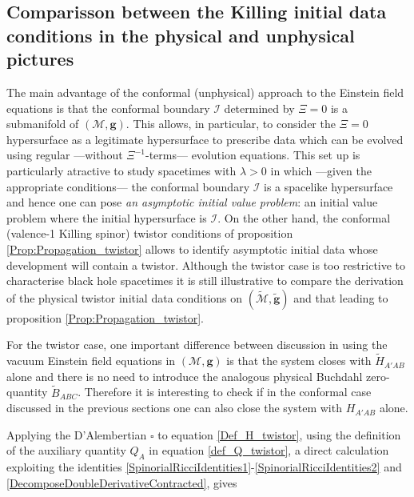 \documentclass[10pt,a4paper]{article}
\theoremstyle{plain}
\def\bmg{{\bm g}}
\begin{document}
{\subsection{Comparisson between the Killing initial data conditions
  in the physical and unphysical pictures}

The main advantage of the conformal (unphysical) approach to the
Einstein field equations is that the conformal boundary $\mathscr{I}$
determined by $\Xi=0$ is a submanifold of $(\mathcal{M},\bmg)$. This
allows, in particular, to consider the $\Xi=0$ hypersurface as a
legitimate hypersurface to prescribe data which can be evolved using
regular ---without $\Xi^{-1}$-terms--- evolution equations.  This set up is
particularly atractive to study spacetimes with $\lambda>0$ in which
---given the appropriate conditions--- the conformal boundary $\mathscr{I}$
is a spacelike hypersurface and hence one can pose \emph{an asymptotic
initial value problem}: an initial value problem where the initial
hypersurface is $\mathscr{I}$.
On the other hand, the conformal (valence-1 Killing spinor) twistor conditions
of proposition \eqref{Prop:Propagation_twistor} allows to identify
asymptotic initial data  whose development will
contain a twistor. Although the twistor case is too restrictive to
characterise black hole spacetimes
it is still illustrative to compare the derivation of the physical
twistor initial data conditions on
$(\tilde{\mathcal{M}},\tilde{\bmg})$ and that leading to proposition
\eqref{Prop:Propagation_twistor}.

For the twistor case, one important difference between discussion in
\cite{GasVal15} using the vacuum Einstein field equations in  $(\mathcal{M},\bmg)$
is that the system closes with $\tilde{H}_{A'AB}$ alone and there is no need
to introduce the analogous physical Buchdahl zero-quantity $\tilde{B}_{ABC}$.
Therefore it is interesting to check if in the conformal case discussed
in the previous sections one can also close the system with $H_{A'AB}$ alone.

Applying the D'Alembertian $\square$ to equation
\eqref{Def_H_twistor}, using the definition of the auxiliary quantity
$Q_A$ in equation \eqref{def_Q_twistor}, a direct calculation exploiting the
identities \eqref{SpinorialRicciIdentities1}-\eqref{SpinorialRicciIdentities2}
and \eqref{DecomposeDoubleDerivativeContracted}, gives

}
\end{document}
